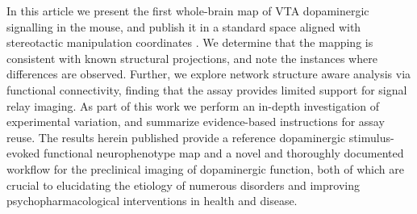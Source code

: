 In this article we present the first whole-brain map of VTA dopaminergic signalling in the mouse, and publish it in a standard space aligned with stereotactic manipulation coordinates \cite{me}.
We determine that the mapping is consistent with known structural projections, and note the instances where differences are observed.
Further, we explore network structure aware analysis via functional connectivity, finding that the assay provides limited support for signal relay imaging.
As part of this work we perform an in-depth investigation of experimental variation, and summarize evidence-based instructions for assay reuse.
The results herein published provide a reference dopaminergic stimulus-evoked functional neurophenotype map and a novel and thoroughly documented workflow for the preclinical imaging of dopaminergic function, both of which are crucial to elucidating the etiology of numerous disorders and improving psychopharmacological interventions in health and disease.
